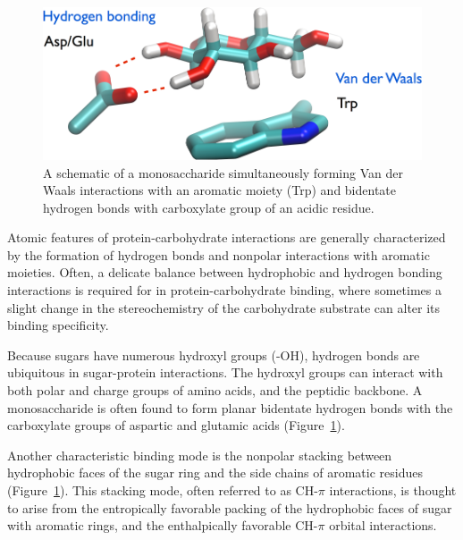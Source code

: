 \begin{figure}
 \centering
 \includegraphics[width=5in]{figures/introduction/sugar_protein_schematic.pdf}
 \caption[A schematic of monosaccharide-protein binding mode]{A schematic of a monosaccharide simultaneously forming Van der Waals interactions with an aromatic moiety (Trp) and bidentate hydrogen bonds with carboxylate group of an acidic residue.}
 \label{fig:sugar_protein_schematic}
\end{figure}

Atomic features of protein-carbohydrate interactions are generally characterized by the formation of hydrogen bonds and nonpolar interactions with aromatic moieties.\cite{Vyas:1991p6498} Often, a delicate balance between hydrophobic and hydrogen bonding interactions is required for in protein-carbohydrate binding, where sometimes a slight change in the stereochemistry of the carbohydrate substrate can alter its binding specificity.\cite{Munske:1984ug} %

Because sugars have numerous hydroxyl groups (-OH), hydrogen bonds are ubiquitous in sugar-protein interactions. The hydroxyl groups can interact with both polar and charge groups of amino acids, and the peptidic backbone.  A monosaccharide is often found to form planar bidentate hydrogen bonds with the carboxylate groups of aspartic and glutamic acids (Figure~\ref{fig:sugar_protein_schematic}).  
 
Another characteristic binding mode is the nonpolar stacking between hydrophobic faces of the sugar ring and the side chains of aromatic residues (Figure~\ref{fig:sugar_protein_schematic}).  This stacking mode, often referred to as CH-$\pi$ interactions, is thought to arise from the entropically favorable packing of the hydrophobic faces of sugar with aromatic rings, and the enthalpically favorable CH-$\pi$ orbital interactions.\cite{Laughrey:2008p6566} %

